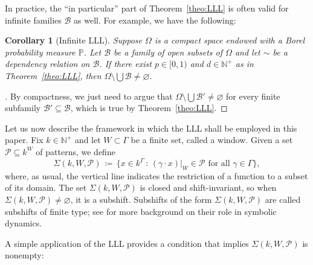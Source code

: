 \documentclass[11pt,reqno,psamsfonts]{amsart}
\theoremstyle{bfnote}
\newtheorem{corl}[theo]{Corollary}
\theoremstyle{definition}
\theoremstyle{remark}
\newcommand{\0}{\varnothing}
\newcommand{\set}[1]{\{#1\}}
\renewcommand{\P}{\mathbb{P}}
\renewcommand{\leq}{\leqslant}
\newcommand{\defeq}{\coloneqq}
\newcommand{\emphd}[1]{{\fontseries{b}\selectfont\textsf{#1}}}
\newcommand{\G}{\Gamma}
\newcommand{\rest}[2]{{{#1}\vert_{#2}}}
\newcommand{\N}{\mathbb{N}}
\numberwithin{equation}{section}
\newenvironment{scproof}[1][]{\begin{proof}[\textsc{\upshape{Proof}}#1]}{\end{proof}}
\begin{document}
    In practice, the ``in particular'' part of Theorem~\ref{theo:LLL} is often valid for infinite families $\mathcal{B}$ as well. For example, we have the following:

    \begin{corl}[{Infinite LLL}]\label{corl:inf_LLL}
        Suppose $\Omega$ is a compact space endowed with a Borel probability measure $\P$. Let $\mathcal{B}$ be a family of open subsets of $\Omega$ and let $\sim$ be a dependency relation on $\mathcal{B}$. If there exist $p \in [0,1)$ and $d \in \N^+$ as in Theorem~\ref{theo:LLL},  %
        then $\Omega \setminus \bigcup \mathcal{B} \neq \0$.
    \end{corl}
    \begin{scproof}
        By compactness, we just need to argue that $\Omega \setminus \bigcup \mathcal{B}' \neq \0$ for every finite subfamily $\mathcal{B}' \subseteq \mathcal{B}$, which is true by Theorem~\ref{theo:LLL}.
    \end{scproof}
    

    Let us now describe the framework in which the LLL shall be employed in this paper. Fix $k \in \N^+$ and let $W \subset \G$ be a finite set, called a \emphd{window}. Given a set $\mathcal{P} \subseteq k^W$ of \emphd{patterns}, we define
    \[
        \Sigma(k, W, \mathcal{P}) \,\defeq\, \big\{x \in k^\G \,:\, \rest{(\gamma \cdot x)}{W} \in \mathcal{P} \text{ for all } \gamma \in \G\big\},
    \]
    where, as usual, the vertical line indicates the restriction of a function to a subset of its domain. The set $\Sigma(k, W, \mathcal{P})$ is closed and shift-invariant, so when $\Sigma(k,W,\mathcal{P}) \neq \0$, it is a subshift. Subshifts of the form $\Sigma(k, W, \mathcal{P})$ are called \emphd{subshifts of finite type}; see \cite{subshifts1,subshifts2} for more background on their role in symbolic dynamics.
    
    A simple application of the LLL provides a condition that implies $\Sigma(k, W, \mathcal{P})$ is nonempty:
\end{document}
